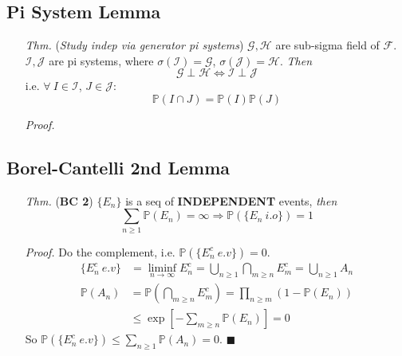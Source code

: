\documentclass[a4paper,12pt,twoside]{book}
\begin{document}
\subsection{Pi System Lemma}
\begin{itemize}
	\item[\textit{Thm.}] (\textit{Study indep via generator pi systems}) $\mathcal{G}, \mathcal{H}$ are sub-sigma field of $\mathcal{F}$. $\mathcal{I}, \mathcal{J}$ are pi systems, where $\sigma(\mathcal{I})=\mathcal{G}$, $\sigma(\mathcal{J})=\mathcal{H}$. \textit{Then}
	$$\mathcal{G}\perp \mathcal{H}\iff \mathcal{I}\perp \mathcal{J}$$
	i.e. $\forall~I\in \mathcal{I}$, $J\in \mathcal{J}$: 
	\begin{equation}
		\mathbb{P}\left(I\cap J\right)=\mathbb{P}\left(I\right)\mathbb{P}\left(J\right)
	\end{equation}

	\item[\textit{Proof.}]
\end{itemize}

\subsection{Borel-Cantelli 2nd Lemma}
\begin{itemize}
	\item[\textit{Thm.}] (\textbf{BC 2}) $\{E_n\}$ is a seq of \textbf{INDEPENDENT} events, \textit{then}
	\begin{equation}
		\sum_{n\geq 1}\mathbb{P}\left(E_n\right)=\infty \Rightarrow \mathbb{P}\left(\{E_n~i.o\}\right)=1
	\end{equation}

	\item[\textit{Proof.}] Do the complement, i.e. $\mathbb{P}\left(\{E_n^c~e.v\}\right)=0$.
	\begin{equation}
		\begin{split}
			\{E_n^c~e.v\}&=\liminf\limits_{n\rightarrow\infty}E^c_n=\bigcup_{n\geq 1}\bigcap_{m\geq n}E_m^c=\bigcup_{n\geq 1}A_n
		\end{split}
	\end{equation}
	\begin{equation}
		\begin{split}
			\mathbb{P}\left(A_n\right)&=\mathbb{P}\left(\bigcap_{m\geq n}E_m^c\right)=\prod_{n\geq m}(1- \mathbb{P}\left(E_n\right))\\
			&\leq \exp\left[-\sum_{m\geq n}\mathbb{P}\left(E_n\right)\right]=0
		\end{split}
	\end{equation}
	So $\mathbb{P}\left(\{E_n^c~e.v\}\right)\leq \sum_{n\geq 1}\mathbb{P}\left(A_n\right)=0$. $\blacksquare$
\end{itemize}
\end{document}
